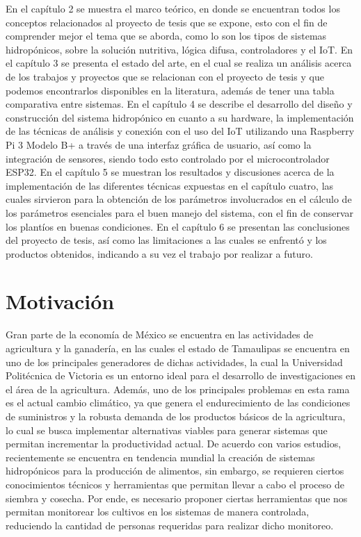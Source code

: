 En el capítulo 2 se muestra el marco teórico, en donde se encuentran todos los conceptos relacionados al proyecto de tesis que se expone, esto con el fin de comprender mejor el tema que se aborda, como lo son los tipos de sistemas hidropónicos, sobre la solución nutritiva, lógica difusa, controladores y el IoT. En el capítulo 3 se presenta el estado del arte, en el cual se realiza un análisis acerca de los trabajos y proyectos que se relacionan con el proyecto de tesis y que podemos encontrarlos disponibles en la literatura, además de tener una tabla comparativa entre sistemas. En el capítulo 4 se describe el desarrollo del diseño y construcción del sistema hidropónico en cuanto a su hardware, la implementación de las técnicas de análisis y conexión con el uso del IoT utilizando una Raspberry Pi 3 Modelo B+ a través de una interfaz gráfica de usuario, así como la integración de sensores, siendo todo esto controlado por el microcontrolador ESP32. En el capítulo 5 se muestran los resultados y discusiones acerca de la implementación de las diferentes técnicas expuestas en el capítulo cuatro, las cuales sirvieron para la obtención de los parámetros involucrados en el cálculo de los parámetros esenciales para el buen manejo del sistema, con el fin de conservar los plantíos en buenas condiciones. En el capítulo 6 se presentan las conclusiones del proyecto de tesis, así como las limitaciones a las cuales se enfrentó y los productos obtenidos, indicando a su vez el trabajo por realizar a futuro.
    
\section{Motivación} \label{chap:motivacion}
Gran parte de la economía de México se encuentra en las actividades de agricultura y la ganadería, en las cuales el estado de Tamaulipas se encuentra en uno de los principales generadores de dichas actividades, la cual la Universidad Politécnica de Victoria es un entorno ideal para el desarrollo de investigaciones en el área de la agricultura. Además, uno de los principales problemas en esta rama es el actual cambio climático, ya que genera el endurecimiento de las condiciones de suministros y la robusta demanda de los productos básicos de la agricultura, lo cual se busca implementar alternativas viables para generar sistemas que permitan incrementar la productividad actual. De acuerdo con varios estudios, recientemente se encuentra en tendencia mundial la creación de sistemas hidropónicos para la producción de alimentos, sin embargo, se requieren ciertos conocimientos técnicos y herramientas que permitan llevar a cabo el proceso de siembra y cosecha. Por ende, es necesario proponer ciertas herramientas que nos permitan monitorear los cultivos en los sistemas de manera controlada, reduciendo la cantidad de personas requeridas para realizar dicho monitoreo. 

